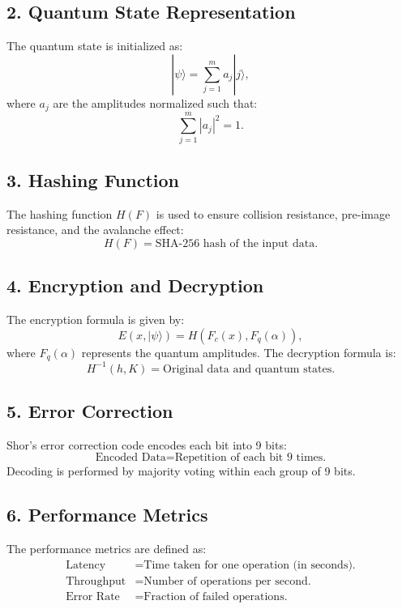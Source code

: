\documentclass{article}
\theoremstyle{plain}
\begin{document}
\subsection*{2. Quantum State Representation}
The quantum state is initialized as:
\begin{equation}
|\psi\rangle = \sum_{j=1}^m a_j |j\rangle,
\end{equation}
where $a_j$ are the amplitudes normalized such that:
\begin{equation}
\sum_{j=1}^m |a_j|^2 = 1.
\end{equation}

\subsection*{3. Hashing Function}
The hashing function $H(F)$ is used to ensure collision resistance, pre-image resistance, and the avalanche effect:
\begin{equation}
H(F) = \text{SHA-256 hash of the input data.}
\end{equation}

\subsection*{4. Encryption and Decryption}
The encryption formula is given by:
\begin{equation}
E(x, |\psi\rangle) = H(F_c(x), F_q(\alpha)),
\end{equation}
where $F_q(\alpha)$ represents the quantum amplitudes. The decryption formula is:
\begin{equation}
H^{-1}(h, K) = \text{Original data and quantum states.}
\end{equation}

\subsection*{5. Error Correction}
Shor's error correction code encodes each bit into 9 bits:
\begin{equation}
\text{Encoded Data} = \text{Repetition of each bit 9 times.}
\end{equation}
Decoding is performed by majority voting within each group of 9 bits.

\subsection*{6. Performance Metrics}
The performance metrics are defined as:
\begin{align}
\text{Latency} &= \text{Time taken for one operation (in seconds).} \\
\text{Throughput} &= \text{Number of operations per second.} \\
\text{Error Rate} &= \text{Fraction of failed operations.}
\end{align}
\end{document}
